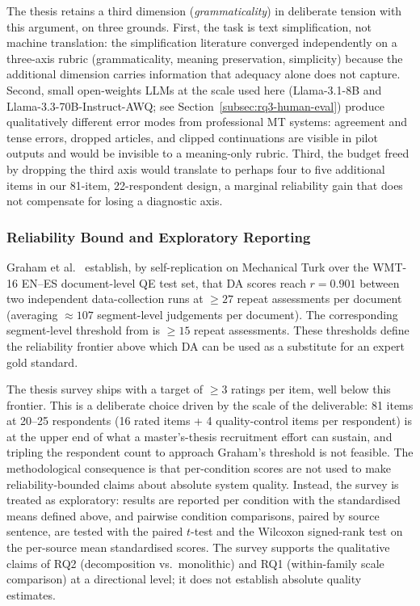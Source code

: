 The thesis retains a third dimension (\textit{grammaticality}) in deliberate tension with this argument, on three grounds. First, the task is text simplification, not machine translation: the simplification literature \cite{Alva-Manchego2020} converged independently on a three-axis rubric (grammaticality, meaning preservation, simplicity) because the additional dimension carries information that adequacy alone does not capture. Second, small open-weights LLMs at the scale used here (Llama-3.1-8B and Llama-3.3-70B-Instruct-AWQ; see Section~\ref{subsec:rq3-human-eval}) produce qualitatively different error modes from professional MT systems: agreement and tense errors, dropped articles, and clipped continuations are visible in pilot outputs and would be invisible to a meaning-only rubric. Third, the budget freed by dropping the third axis would translate to perhaps four to five additional items in our 81-item, 22-respondent design, a marginal reliability gain that does not compensate for losing a diagnostic axis.

\subsubsection{Reliability Bound and Exploratory Reporting}
\label{sec:reliability-bound}

Graham et al.\ \cite{Graham2017} establish, by self-replication on Mechanical Turk over the WMT-16 EN--ES document-level QE test set, that DA scores reach $r = 0.901$ between two independent data-collection runs at $\geq 27$ repeat assessments per document (averaging $\approx 107$ segment-level judgements per document). The corresponding segment-level threshold from \cite{Graham2013} is $\geq 15$ repeat assessments. These thresholds define the reliability frontier above which DA can be used as a substitute for an expert gold standard.

The thesis survey ships with a target of $\geq 3$ ratings per item, well below this frontier. This is a deliberate choice driven by the scale of the deliverable: 81 items at 20--25 respondents (16 rated items + 4 quality-control items per respondent) is at the upper end of what a master's-thesis recruitment effort can sustain, and tripling the respondent count to approach Graham's threshold is not feasible. The methodological consequence is that per-condition scores are not used to make reliability-bounded claims about absolute system quality. Instead, the survey is treated as exploratory: results are reported per condition with the standardised means defined above, and pairwise condition comparisons, paired by source sentence, are tested with the paired $t$-test and the Wilcoxon signed-rank test on the per-source mean standardised scores. The survey supports the qualitative claims of RQ2 (decomposition vs.\ monolithic) and RQ1 (within-family scale comparison) at a directional level; it does not establish absolute quality estimates.

